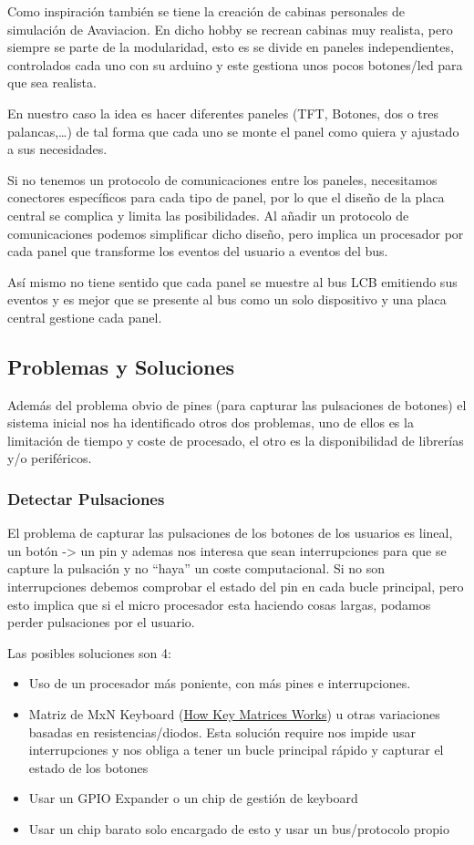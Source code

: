 Como inspiración también se tiene la creación de cabinas personales de simulación de Avaviacion. En dicho hobby
se recrean cabinas muy realista, pero siempre se parte de la modularidad, esto es se divide en paneles
independientes, controlados cada uno con su arduino y este gestiona unos pocos botones/led para que sea realista.

En nuestro caso la idea es hacer diferentes paneles (TFT, Botones, dos o tres palancas,…) de tal forma que cada
uno se monte el panel como quiera y ajustado a sus necesidades.

Si no tenemos un protocolo de comunicaciones entre los paneles, necesitamos conectores específicos para cada tipo
de panel, por lo que el diseño de la placa central se complica y limita las posibilidades. Al añadir un protocolo
de comunicaciones podemos simplificar dicho diseño, pero implica un procesador por cada panel que transforme los
eventos del usuario a eventos del bus.

Así mismo no tiene sentido que cada panel se muestre al bus LCB emitiendo sus eventos y es mejor que se presente
al bus como un solo dispositivo y una placa central gestione cada panel.

\subsection{Problemas y Soluciones}
Además del problema obvio de pines (para capturar las pulsaciones de botones) el sistema inicial nos ha
identificado otros dos problemas, uno de ellos es la limitación de tiempo y coste de procesado, el otro es
la disponibilidad de librerías y/o periféricos.

\subsubsection{Detectar Pulsaciones}
El problema de capturar las pulsaciones de los botones de los usuarios es lineal, un botón -> un pin y ademas
nos interesa que sean interrupciones para que se capture la pulsación y no “haya” un coste computacional. Si no
son interrupciones debemos comprobar el estado del pin en cada bucle principal, pero esto implica que si el micro
procesador esta haciendo cosas largas, podamos perder pulsaciones por el usuario.

Las posibles soluciones son 4:
\begin{itemize}
    \item{} Uso de un procesador más poniente, con más pines e interrupciones.
    \item{} Matriz de MxN Keyboard  (\href{https://pcbheaven.com/wikipages/How_Key_Matrices_Works/}{How Key
              Matrices Works}) u otras variaciones basadas en resistencias/diodos. Esta solución require nos impide usar
          interrupciones y nos obliga a tener un bucle principal rápido y capturar el estado de los botones
    \item{} Usar un GPIO Expander o un chip de gestión de keyboard
    \item{} Usar un chip barato solo encargado de esto y usar un bus/protocolo propio
\end{itemize}

